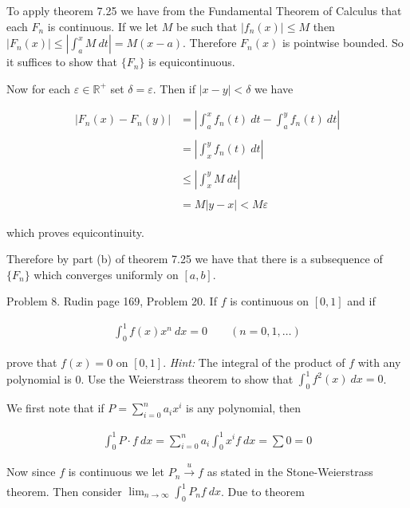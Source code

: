 \documentclass{article}
\begin{document}
  \vspace{1cm} 

  To apply theorem 7.25 we have from the Fundamental Theorem of Calculus that each $F_n$ is continuous.  If we let $M$ be such that $|f_n(x)|\le M$ then $|F_n(x)| \le \left|\int_a^x M \ dt \right| =M(x-a)$.  Therefore $F_n(x)$ is pointwise bounded.  So it suffices to show that $\{F_n\}$ is equicontinuous.  

  Now for each $\varepsilon\in\mathbb R^+$ set $\delta=\varepsilon$.  Then if $|x-y|<\delta$ we have 

  \begin{align*}
    \left|F_n(x)-F_n(y)\right| &= \left|\int_a^x f_n(t)\ dt-\int_a^y f_n(t)\ dt\right| \\\\
    &= \left|\int_x^y f_n(t)\ dt \right| \\\\
    &\le \left|\int_x^y M\ dt \right| \\\\
    &= M|y-x| < M\varepsilon
  \end{align*}

  which proves equicontinuity.  

  Therefore by part (b) of theorem 7.25 we have that there is a subsequence of $\{F_n\}$ which converges uniformly on $[a,b]$.

\pagebreak
  
{\Large \color{Sepia} Problem 8. Rudin page 169, Problem 20. If $f$ is continuous on $[0,1]$ and if 

\begin{align*}
    \int_0^1 f(x) x^n \ dx = 0 \qquad (n=0,1,\dots)
\end{align*}

prove that $f(x)=0$ on $[0,1]$.  {\it Hint:} The integral of the product of $f$ with any polynomial is 0.  Use the Weierstrass theorem to show that $\int_0^1 f^2(x) \ dx = 0$.

}

\vspace{1cm} 

We first note that if $P=\sum_{i=0}^n a_ix^i$ is any polynomial, then 

\begin{align*}
  \int_0^1 P\cdot f \ dx = \sum_{i=0}^n a_i\int_0^1 x^i f \ dx = \sum 0 = 0
\end{align*}

Now since $f$ is continuous we let $P_n\xrightarrow[]{u} f$ as stated in the Stone-Weierstrass theorem.  Then consider $\lim_{n\to \infty}\int_0^1 P_nf \ dx$.  Due to theorem 
\end{document}
